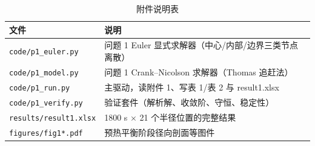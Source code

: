 \documentclass[12pt,a4paper]{ctexart}
\begin{document}
\begin{table}[H]
\centering
\caption{附件说明表}
\label{tab:appendix}
\begin{tabular}{ll}
\toprule
文件 & 说明 \\
\midrule
\texttt{code/p1\_euler.py} & 问题 1 Euler 显式求解器（中心/内部/边界三类节点离散） \\
\texttt{code/p1\_model.py} & 问题 1 Crank--Nicolson 求解器（Thomas 追赶法） \\
\texttt{code/p1\_run.py} & 主驱动，读附件 1、写表 1/表 2 与 result1.xlsx \\
\texttt{code/p1\_verify.py} & 验证套件（解析解、收敛阶、守恒、稳定性） \\
\texttt{results/result1.xlsx} & 1800 s $\times$ 21 个半径位置的完整结果 \\
\texttt{figures/fig1*.pdf} & 预热平衡阶段径向剖面等图件 \\
\bottomrule
\end{tabular}
\end{table}
\end{document}
